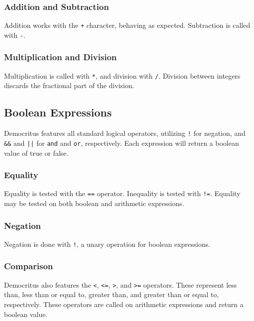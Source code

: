 		\subsubsection{Addition and Subtraction}
			Addition works with the \texttt{+} character, behaving as expected. Subtraction is called with \texttt{-}.
						
		\subsubsection{Multiplication and Division} 
		  Multiplication is called with \texttt{*}, and division with \texttt{/}. Division between integers discards the fractional part of the division. 	

    \iffalse
    \subsubsection{Modulus}
      The remainder of an integer division operation can be computed via the modulo \texttt{\%} operator.
	
		\subsubsection{Bit Shifting}
			Integers can be bit-shifted with \verb|>>| and \verb|<<|.
	  \fi

	\subsection{Boolean Expressions}
		Democritus features all standard logical operators, utilizing \texttt{!} for negation, and \verb|&&| and \verb^||^ for \texttt{and} and \texttt{or}, respectively. Each expression will return a boolean value of true or false.

    \subsubsection{Equality}
            Equality is tested with the \texttt{==} operator. Inequality is tested with \texttt{!=}. Equality may be tested on both boolean and arithmetic expressions. 
			
		\subsubsection{Negation}
			Negation is done with \texttt{!}, a unary operation for boolean expressions. 

    \subsubsection{Comparison}
      Democritus also features the \verb|<|, \verb|<=|, \verb|>|, and \verb|>=| operators. These represent less than, less than or equal to, greater than, and greater than or equal to, respectively. These operators are called on arithmetic expressions and return a boolean value. 
            

